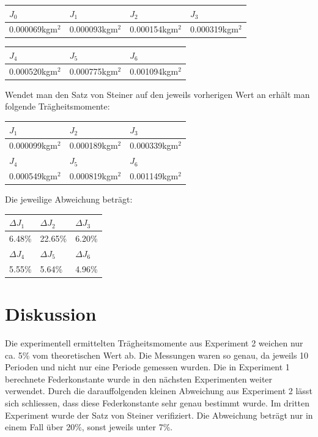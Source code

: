 \documentclass[12pt,a4paper]{article}
\begin{document}
\vspace{15pt}
\begin{tabular}{|l|l|l|l|}
\hline
$J_{0}$&$J_{1}$&$J_{2}$&$J_{3}$\\
\hline
0.000069kgm${}^2$&0.000093kgm${}^2$&0.000154kgm${}^2$&0.000319kgm${}^2$\\
\hline
\end{tabular}

\begin{tabular}{|l|l|l|}
\hline
$J_{4}$&$J_{5}$&$J_{6}$\\
\hline
0.000520kgm${}^2$&0.000775kgm${}^2$&0.001094kgm${}^2$\\
\hline
\end{tabular}

\vspace{15pt} \noindent
Wendet man den Satz von Steiner auf den jeweils vorherigen Wert an erh\"alt man folgende Tr\"agheitsmomente:

\vspace{15pt}
\begin{tabular}{|l|l|l|}
\hline
$J_{1}$&$J_{2}$&$J_{3}$\\
\hline
0.000099kgm${}^2$&0.000189kgm${}^2$&0.000339kgm${}^2$\\
\hline
\hline
$J_{4}$&$J_{5}$&$J_{6}$\\
\hline
0.000549kgm${}^2$&0.000819kgm${}^2$&0.001149kgm${}^2$\\
\hline
\end{tabular}

\vspace{15pt} \noindent
Die jeweilige Abweichung betr\"agt:

\vspace{15pt}
\begin{tabular}{|l|l|l|}
\hline
$\Delta J_{1}$&$\Delta J_{2}$&$\Delta J_{3}$\\
\hline
6.48\%&22.65\%&6.20\%\\
\hline
\hline
$\Delta J_{4}$&$\Delta J_{5}$&$\Delta J_{6}$\\
\hline
5.55\%&5.64\%&4.96\%\\
\hline
\end{tabular}

\section*{Diskussion}
Die experimentell ermittelten Tr\"agheitsmomente aus Experiment 2 weichen nur ca. 5\% vom theoretischen Wert ab. Die Messungen waren so genau, da jeweils 10 Perioden und nicht nur eine Periode gemessen wurden.
Die in Experiment 1 berechnete Federkonstante wurde in den n\"achsten Experimenten weiter verwendet. Durch die darauffolgenden kleinen Abweichung aus Experiment 2 l\"asst sich schliessen, dass diese Federkonstante sehr genau bestimmt wurde.
Im dritten Experiment wurde der Satz von Steiner verifiziert. Die Abweichung betr\"agt nur in einem Fall \"uber 20\%, sonst jeweils unter 7\%.
\end{document}
